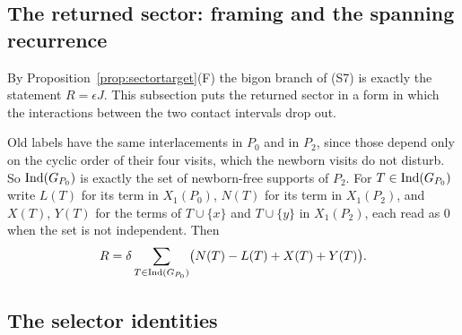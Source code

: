 \subsection{The returned sector: framing and the spanning recurrence}
\label{sec:spanning}

By Proposition~\ref{prop:sectortarget}(F) the bigon branch of (S7) is exactly the
statement $R=\epsilon J$. This subsection puts the returned sector in a form in
which the interactions between the two contact intervals drop out.

\begin{definition}\label{def:branches}
Old labels have the same interlacements in $P_0$ and in $P_2$, since those
depend only on the cyclic order of their four visits, which the newborn visits
do not disturb. So $\operatorname{Ind}(G_{P_0})$ is exactly the set of newborn-free supports
of $P_2$. For $T\in\operatorname{Ind}(G_{P_0})$ write $L(T)$ for its term in $X_1(P_0)$,
$N(T)$ for its term in $X_1(P_2)$, and $X(T)$, $Y(T)$ for the terms of
$T\cup\{x\}$ and $T\cup\{y\}$ in $X_1(P_2)$, each read as $0$ when the set is
not independent. Then
\[
   R=\delta\sum_{T\in\operatorname{Ind}(G_{P_0})}\bigl(N(T)-L(T)+X(T)+Y(T)\bigr).
\]
\end{definition}

\subsection{The selector identities}\label{sec:selectors}



